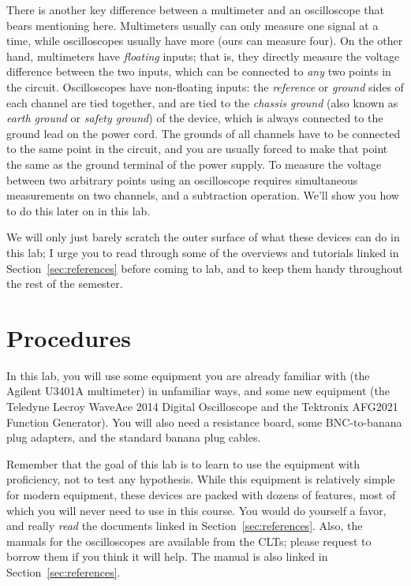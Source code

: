 \documentclass[12pt]{article}
\begin{document}
There is another key difference between a multimeter and an
oscilloscope that bears mentioning here.  Multimeters usually can only
measure one signal at a time, while oscilloscopes usually have more
(ours can measure four).  On the other hand, multimeters have
\textit{floating} inputs; that is, they directly measure the voltage
difference between the two inputs, which can be connected to
\textit{any} two points in the circuit.  Oscilloscopes have
non-floating inputs: the \textit{reference} or \textit{ground} sides
of each channel are tied together, and are tied to the \textit{chassis
  ground} (also known as \textit{earth ground} or \textit{safety
  ground}) of the device, which is always connected to the ground lead
on the power cord.  The grounds of all channels have to be connected
to the same point in the circuit, and you are usually forced to make
that point the same as the ground terminal of the power supply.  To
measure the voltage between two arbitrary points using an oscilloscope
requires simultaneous measurements on two channels, and a subtraction
operation.  We'll show you how to do this later on in this lab.

We will only just barely scratch the outer surface of what these
devices can do in this lab; I urge you to read through some of the
overviews and tutorials linked in Section~\ref{sec:references} before
coming to lab, and to keep them handy throughout the rest of the
semester. 

\section{Procedures}
\label{sec:procedures}

In this lab, you will use some equipment you are already familiar with
(the Agilent U3401A multimeter) in unfamiliar ways, and some new
equipment (the Teledyne Lecroy WaveAce 2014 Digital Oscilloscope and
the Tektronix AFG2021 Function Generator).  You will also need a
resistance board, some BNC-to-banana plug adapters, and the standard
banana plug cables.

Remember that the goal of this lab is to learn to use the equipment
with proficiency, not to test any hypothesis.  While this equipment is
relatively simple for modern equipment, these devices are packed with
dozens of features, most of which you will never need to use in this
course.  You would do yourself a favor, and really \textit{read} the
documents linked in Section~\ref{sec:references}.  Also, the manuals
for the oscilloscopes are available from the CLTs; please request to
borrow them if you think it will help.  The manual is also linked in
Section~\ref{sec:references}.
\end{document}
